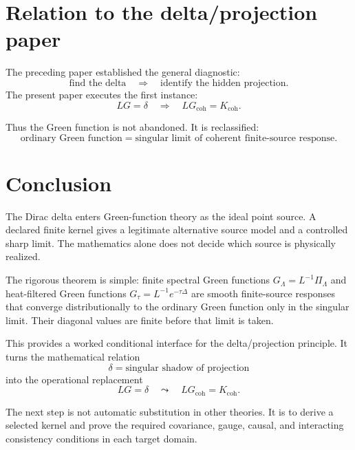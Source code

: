 \documentclass[11pt]{article}
\begin{document}
\section{Relation to the delta/projection paper}

The preceding paper established the general diagnostic:
\[
\text{find the delta} \quad\Rightarrow\quad \text{identify the hidden projection}.
\]
The present paper executes the first instance:
\[
LG=\delta
\quad\Rightarrow\quad
LG_{\mathrm{coh}}=K_{\mathrm{coh}}.
\]

Thus the Green function is not abandoned. It is reclassified:
\[
\boxed{
\text{ordinary Green function}=\text{singular limit of coherent finite-source response}.
}
\]

\section{Conclusion}

The Dirac delta enters Green-function theory as the ideal point source.  A
declared finite kernel gives a legitimate alternative source model and a
controlled sharp limit.  The mathematics alone does not decide which source
is physically realized.

The rigorous theorem is simple: finite spectral Green functions \(G_\Lambda=L^{-1}\Pi_\Lambda\) and heat-filtered Green functions \(G_\tau=L^{-1}e^{-\tau\Delta}\) are smooth finite-source responses that converge distributionally to the ordinary Green function only in the singular limit. Their diagonal values are finite before that limit is taken.

This provides a worked conditional interface for the delta/projection
principle.  It turns the mathematical relation
\[
\delta=\text{singular shadow of projection}
\]
into the operational replacement
\[
LG=\delta
\quad\leadsto\quad
LG_{\mathrm{coh}}=K_{\mathrm{coh}}.
\]

The next step is not automatic substitution in other theories.  It is to
derive a selected kernel and prove the required covariance, gauge, causal,
and interacting consistency conditions in each target domain.
\end{document}
